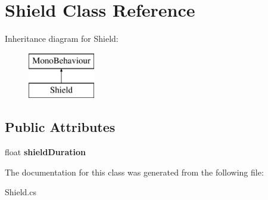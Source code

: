 \hypertarget{class_shield}{}\section{Shield Class Reference}
\label{class_shield}
Inheritance diagram for Shield\+:\begin{figure}[H]
\begin{center}
\leavevmode
\includegraphics[height=2.000000cm]{class_shield}
\end{center}
\end{figure}
\subsection*{Public Attributes}
\begin{DoxyCompactItemize}
\item 
\mbox{\label{class_shield_ac92a7a2922666b60af656d75f21b7d9a}} 
float {\bfseries shield\+Duration}
\end{DoxyCompactItemize}


The documentation for this class was generated from the following file\+:\begin{DoxyCompactItemize}
\item 
Shield.\+cs\end{DoxyCompactItemize}
